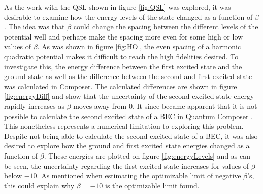 \documentclass[a4paper, twocolumn]{revtex4-1}
\begin{document}
As the work with the QSL shown in figure \ref{fig:QSL} was explored, it was desirable to examine how the energy levels of the state changed as a function of $\beta$. The idea was that $\beta$ could change the spacing between the different levels of the potential well and perhaps make the spacing more even for some high or low values of $\beta$. As was shown in figure \ref{fig:HO}, the even spacing of a harmonic quadratic potential makes it difficult to reach the high fidelities desired. To investigate this, the energy difference between the first excited state and the ground state as well as the difference between the second and first excited state was calculated in Composer. The calculated differences are shown in figure \ref{fig:energyDiff} and show that the uncertainty of the second excited state energy rapidly increases as $\beta$ moves away from $0$. It since became apparent that it is not possible to calculate the second excited state of a BEC in Quantum Composer \cite{QEngine}. This nonetheless represents a numerical limitation to exploring this problem. \\

Despite not being able to calculate the second excited state of a BEC, it was also desired to explore how the ground and first excited state energies changed as a function of $\beta$. These energies are plotted on figure \ref{fig:energyLevels} and as can be seen, the uncertainty regarding the first excited state increases for values of $\beta$ below $-10$. As mentioned when estimating the optimizable limit of negative $\beta$'s, this could explain why $\beta=-10$ is the optimizable limit found.\\
\end{document}
